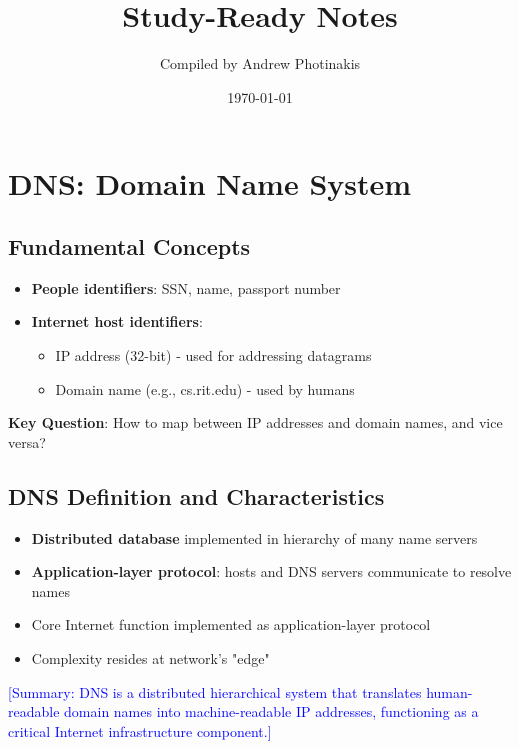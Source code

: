 \documentclass[12pt]{article}
\title{\TOPICTITLE\\\large Study-Ready Notes}
\author{Compiled by Andrew Photinakis}
\date{\today}
\begin{document}
\maketitle
\tableofcontents
\newpage


\section{DNS: Domain Name System}
\subsection{Fundamental Concepts}

\begin{itemize}
    \item \textbf{People identifiers}: SSN, name, passport number
    \item \textbf{Internet host identifiers}:
          \begin{itemize}
              \item IP address (32-bit) - used for addressing datagrams
              \item Domain name (e.g., cs.rit.edu) - used by humans
          \end{itemize}
\end{itemize}

\textbf{Key Question}: How to map between IP addresses and domain names, and vice versa?

\subsection{DNS Definition and Characteristics}
\begin{itemize}
    \item \textbf{Distributed database} implemented in hierarchy of many name servers
    \item \textbf{Application-layer protocol}: hosts and DNS servers communicate to resolve names
    \item Core Internet function implemented as application-layer protocol
    \item Complexity resides at network's "edge"
\end{itemize}

\textcolor{blue}{[Summary: DNS is a distributed hierarchical system that translates human-readable domain names into machine-readable IP addresses, functioning as a critical Internet infrastructure component.]}
\end{document}
